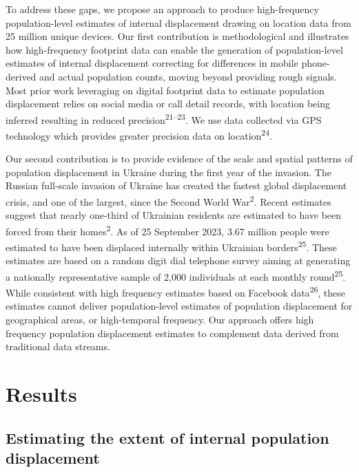 \documentclass[
  11pt,
]{article}
\begin{document}
To address these gaps, we propose an approach to produce high-frequency
population-level estimates of internal displacement drawing on location
data from 25 million unique devices. Our first contribution is
methodological and illustrates how high-frequency footprint data can
enable the generation of population-level estimates of internal
displacement correcting for differences in mobile phone-derived and
actual population counts, moving beyond providing rough signals. Most
prior work leveraging on digital footprint data to estimate population
displacement relies on social media or call detail records, with
location being inferred resulting in reduced
precision\textsuperscript{21--23}. We use data collected via GPS
technology which provides greater precision data on
location\textsuperscript{24}.

Our second contribution is to provide evidence of the scale and spatial
patterns of population displacement in Ukraine during the first year of
the invasion. The Russian full-scale invasion of Ukraine has created the
fastest global displacement crisis, and one of the largest, since the
Second World War\textsuperscript{2}. Recent estimates suggest that
nearly one-third of Ukrainian residents are estimated to have been
forced from their homes\textsuperscript{2}. As of 25 September 2023,
3.67 million people were estimated to have been displaced internally
within Ukrainian borders\textsuperscript{25}. These estimates are based
on a random digit dial telephone survey aiming at generating a
nationally representative sample of 2,000 individuals at each monthly
round\textsuperscript{25}. While consistent with high frequency
estimates based on Facebook data\textsuperscript{26}, these estimates
cannot deliver population-level estimates of population displacement for
geographical areas, or high-temporal frequency. Our approach offers high
frequency population displacement estimates to complement data derived
from traditional data streams.

\section{Results}\label{results}

\subsection{Estimating the extent of internal population
displacement}\label{estimating-the-extent-of-internal-population-displacement}
\end{document}
